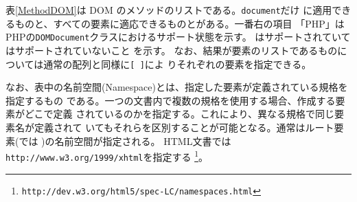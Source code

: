 表\ref{MethodDOM}は DOM のメソッドのリストである。\texttt{document}だけ
に適用できるものと、すべての要素に適応できるものとがある。一番右の項目
「PHP」はPHPの\texttt{DOMDocument}クラスにおけるサポート状態を示す。
\Yes はサポートされていて\No はサポートされていないこと
を示す。
なお、結果が要素のリストであるものについては通常の配列と同様に\texttt{[ ]}によ
りそれぞれの要素を指定できる。

なお、表中の名前空間(Namespace)とは、指定した要素が定義されている規格を指定するもの
である。一つの文書内で複数の規格を使用する場合、作成する要素がどこで定義
されているのかを指定する。これにより、異なる規格で同じ要素名が定義されて
いてもそれらを区別することが可能となる。通常はルート要素(\HTML では
)の名前空間が指定される。
HTML文書では\texttt{ http://www.w3.org/1999/xhtml}を指定する
\footnote{\texttt{http://dev.w3.org/html5/spec-LC/namespaces.html}}。
\newpage
